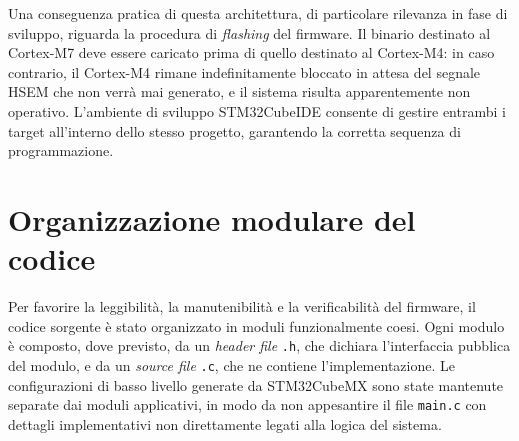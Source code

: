 \documentclass[11pt]{report}
\begin{document}
Una conseguenza pratica di questa architettura, di particolare rilevanza in fase di sviluppo, riguarda la procedura di \textit{flashing} del firmware. Il binario destinato al Cortex-M7 deve essere caricato prima di quello destinato al Cortex-M4: in caso contrario, il Cortex-M4 rimane indefinitamente bloccato in attesa del segnale HSEM che non verrà mai generato, e il sistema risulta apparentemente non operativo. L'ambiente di sviluppo STM32CubeIDE consente di gestire entrambi i target all'interno dello stesso progetto, garantendo la corretta sequenza di programmazione.

\section{Organizzazione modulare del codice}
Per favorire la leggibilità, la manutenibilità e la verificabilità del firmware, il codice sorgente è stato organizzato in moduli funzionalmente coesi. Ogni modulo è composto, dove previsto, da un \textit{header file} \texttt{.h}, che dichiara l'interfaccia pubblica del modulo, e da un \textit{source file} \texttt{.c}, che ne contiene l'implementazione. Le configurazioni di basso livello generate da STM32CubeMX sono state mantenute separate dai moduli applicativi, in modo da non appesantire il file \texttt{main.c} con dettagli implementativi non direttamente legati alla logica del sistema.
\end{document}
